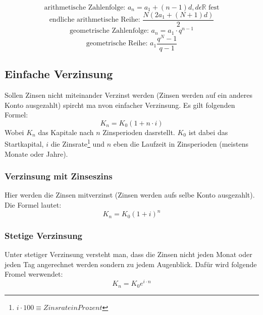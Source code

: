 \documentclass[a4paper]{scrartcl}
\begin{document}
        \begin{equation*}
            \text{arithmetische Zahlenfolge: } a_n = a_1 + (n - 1)d, d \epsilon \mathbb{R} \text{ fest} 
        \end{equation*}
        \begin{equation*}
            \text{endliche arithmetische Reihe: } \frac{N(2a_1+(N+1)d)}{2}
        \end{equation*}
        \begin{equation*}
            \text{geometrische Zahlenfolge: } a_n = a_1 \cdot q^{n-1}
        \end{equation*}
        \begin{equation*}
            \text{geometrische Reihe: } a_1 \frac{q^N - 1}{q - 1}
        \end{equation*}

        \subsection{Einfache Verzinsung}
        Sollen Zinsen nicht miteinander Verzinst werden (Zinsen werden auf ein anderes Konto ausgezahlt) spircht ma nvon einfacher Verzinsung. Es gilt folgenden Formel:
        \begin{equation*}
            K_n = K_0(1 + n \cdot i)
        \end{equation*}
        Wobei \(K_n\) das Kapitale nach \(n\) Zinsperioden dasrstellt. \(K_0\) ist dabei das Startkapital, \(i\) die Zinsrate\footnote{\(i \cdot 100 \equiv Zinsrate in Prozent\)} und \(n\)
        eben die Laufzeit in Zinsperioden (meistens Monate oder Jahre).
            \subsubsection{Verzinsung mit Zinseszins}
            Hier werden die Zinsen mitverzinst (Zinsen werden aufs selbe Konto ausgezahlt). Die Formel lautet: 
            \begin{equation*}
                K_n = K_0(1+i)^n
            \end{equation*} 

            \subsubsection{Stetige Verzinsung}
            Unter stetiger Verzinsung versteht man, dass die Zinsen nicht jeden Monat oder jeden Tag angerechnet werden sondern zu jedem Augenblick. Dafür wird folgende Fromel werwendet: 
            \begin{equation*}
                K_n = K_0 e^{i \cdot n}
            \end{equation*}
\end{document}
